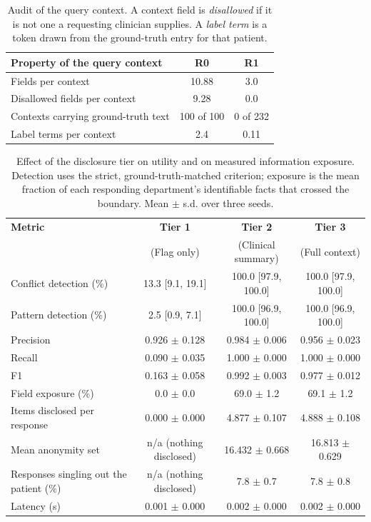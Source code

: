 
\begin{table}[!t]
\centering
\caption{Audit of the query context. A context field is \emph{disallowed} if it is not one a requesting clinician supplies. A \emph{label term} is a token drawn from the ground-truth entry for that patient.}
\label{tab:r1_context_audit}
\small
\begin{tabular}{lcc}
\toprule
\textbf{Property of the query context} & \textbf{R0} & \textbf{R1} \\
\midrule
Fields per context & 10.88 & 3.0 \\
Disallowed fields per context & 9.28 & 0.0 \\
Contexts carrying ground-truth text & 100 of 100 & 0 of 232 \\
Label terms per context & 2.4 & 0.11 \\
\bottomrule
\end{tabular}
\end{table}

\begin{table}[!t]
\centering
\caption{Effect of the disclosure tier on utility and on measured information exposure. Detection uses the strict, ground-truth-matched criterion; exposure is the mean fraction of each responding department's identifiable facts that crossed the boundary. Mean $\pm$ s.d. over three seeds.}
\label{tab:r1_tiers}
\small
\begin{tabular}{lccc}
\toprule
\textbf{Metric} & \textbf{Tier 1} & \textbf{Tier 2} & \textbf{Tier 3} \\
 & (Flag only) & (Clinical summary) & (Full context) \\
\midrule
Conflict detection (\%) & 13.3 [9.1, 19.1] & 100.0 [97.9, 100.0] & 100.0 [97.9, 100.0] \\
Pattern detection (\%) & 2.5 [0.9, 7.1] & 100.0 [96.9, 100.0] & 100.0 [96.9, 100.0] \\
Precision & 0.926 $\pm$ 0.128 & 0.984 $\pm$ 0.006 & 0.956 $\pm$ 0.023 \\
Recall & 0.090 $\pm$ 0.035 & 1.000 $\pm$ 0.000 & 1.000 $\pm$ 0.000 \\
F1 & 0.163 $\pm$ 0.058 & 0.992 $\pm$ 0.003 & 0.977 $\pm$ 0.012 \\
Field exposure (\%) & 0.0 $\pm$ 0.0 & 69.0 $\pm$ 1.2 & 69.1 $\pm$ 1.2 \\
Items disclosed per response & 0.000 $\pm$ 0.000 & 4.877 $\pm$ 0.107 & 4.888 $\pm$ 0.108 \\
Mean anonymity set & n/a (nothing disclosed) & 16.432 $\pm$ 0.668 & 16.813 $\pm$ 0.629 \\
Responses singling out the patient (\%) & n/a (nothing disclosed) & 7.8 $\pm$ 0.7 & 7.8 $\pm$ 0.8 \\
Latency (s) & 0.001 $\pm$ 0.000 & 0.002 $\pm$ 0.000 & 0.002 $\pm$ 0.000 \\
\bottomrule
\end{tabular}
\end{table}


